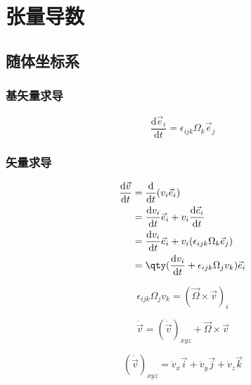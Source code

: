 \chapter{张量导数}

\section{随体坐标系}
\subsection{基矢量求导}
\begin{equation}
  \frac{\mathrm{d} \vec{e}_i}{\mathrm{d}t}=\epsilon_{ijk}\Omega_k\vec{e}_j
\end{equation}
\subsection{矢量求导}
\begin{equation}
  \begin{split}
    \frac{\mathrm{d} \vec{v}}{\mathrm{d}t}&=\frac{\mathrm{d}}{\mathrm{d}t}(v_i\vec{e}_i)\\
    &=\frac{\mathrm{d}v_i}{\mathrm{d}t}\vec{e}_i+v_i\frac{\mathrm{d}\vec{e}_i}{\mathrm{d}t}\\
    &=\frac{\mathrm{d}v_i}{\mathrm{d}t}\vec{e}_i+v_i(\epsilon_{ijk}\Omega_k\vec{e}_j)\\
    &=\qty(\frac{\mathrm{d}v_i}{\mathrm{d}t}+\epsilon_{ijk}\Omega_jv_k)\vec{e}_i
  \end{split}
\end{equation}

\begin{equation}
  \epsilon_{ijk}\Omega_jv_k=(\vec{\Omega}\times\vec{v})_{i}
\end{equation}

\begin{equation}
  \dot{\vec{v}}=(\dot{\vec{v}})_{xyz}+\vec{\Omega}\times\vec{v}
\end{equation}

\begin{equation}
  (\dot{\vec{v}})_{xyz}=\dot{v}_x\vec{i}+\dot{v}_y\vec{j}+\dot{v}_z\vec{k}
\end{equation}

